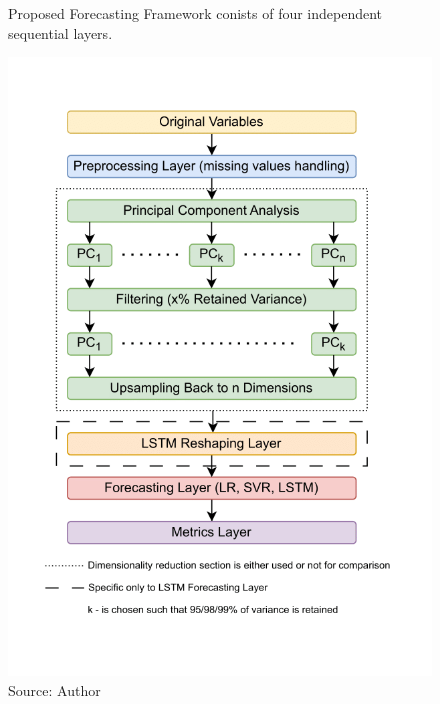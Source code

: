 \begin{figure}[!h]
    \centering
    \caption{Proposed Forecasting Framework conists of 
    four independent sequential layers.}
    \includegraphics[width=1\textwidth]{Figures/Forecasting_framework.drawio.png}
    \caption*{Source: Author}
    \label{fig:forecasting_framework}
\end{figure}
